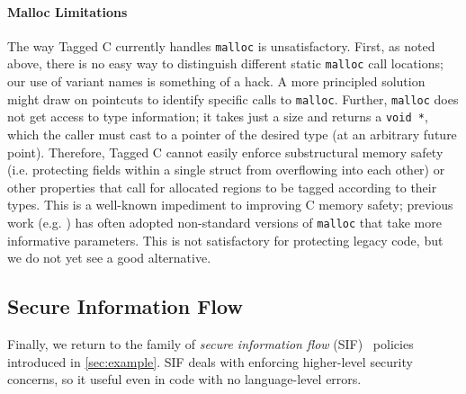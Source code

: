 \documentclass{llncs}
\begin{document}
\paragraph*{Malloc Limitations}
\label{sec:limitations}

The way Tagged C currently handles {\tt malloc} is unsatisfactory. First, as noted above, there is no
easy way to distinguish different static {\tt malloc} call locations; our use of
variant names is something of a hack.
A more principled solution might draw on pointcuts to identify specific calls to {\tt malloc}.
Further, {\tt malloc} does not get access to type information;
it takes just a size and returns a {\tt void *}, which the caller must
cast to a pointer of the desired type (at an arbitrary future point).
Therefore, Tagged C cannot easily
enforce substructural memory safety (i.e. protecting fields within a single struct
from overflowing into each other) or other properties that call for allocated
regions to be tagged according to their types.
This is a well-known impediment to improving C memory safety;
previous work  (e.g. \cite{Michael23:MSWASM}) has often adopted non-standard
versions of {\tt malloc} that take more informative parameters. This is
not satisfactory for protecting legacy code, but we do not yet see a good alternative.

\subsection{Secure Information Flow}
\label{sec:SIF}

Finally, we return to the family of 
{\em secure information flow} (SIF)~\cite{Denning77:SecureInformationFlow} policies
introduced in \cref{sec:example}. 
SIF deals with enforcing higher-level security concerns, so it useful even in code with no language-level errors.
\end{document}
